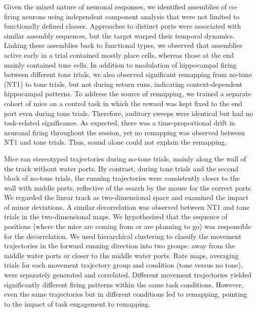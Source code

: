 Given the mixed nature of neuronal responses, we identified assemblies of co-firing neurons using independent component analysis that were not limited to functionally defined classes. Approaches to distinct ports were associated with similar assembly sequences, but the target warped their temporal dynamics. Linking these assemblies back to functional types, we observed that assemblies active early in a trial contained mostly place cells, whereas those at the end mainly contained tone cells. In addition to modulation of hippocampal firing between different tone trials, we also observed significant remapping from no-tone (NT1) to tone trials, but not during return runs, indicating context-dependent hippocampal patterns. To address the source of remapping, we trained a separate cohort of mice on a control task in which the reward was kept fixed to the end port even during tone trials. Therefore, auditory sweeps were identical but had no task-related significance. As expected, there was a time-proportional drift in neuronal firing throughout the session, yet no remapping was observed between NT1 and tone trials. Thus, sound alone could not explain the remapping.

Mice ran stereotyped trajectories during no-tone trials, mainly along the wall of the track without water ports. By contrast, during tone trials and the second block of no-tone trials, the running trajectories were consistently closer to the wall with middle ports, reflective of the search by the mouse for the correct ports. We regarded the linear track as two-dimensional space and examined the impact of minor deviations. A similar decorrelation was observed between NT1 and tone trials in the two-dimensional maps. We hypothesized that the sequence of positions (where the mice are coming from or are planning to go) was responsible for the decorrelation. We used hierarchical clustering to classify the movement trajectories in the forward running direction into two groups: away from the middle water ports or closer to the middle water ports. Rate maps, averaging trials for each movement trajectory group and condition (tone versus no tone), were separately generated and correlated. Different movement trajectories yielded significantly different firing patterns within the same task conditions. However, even the same trajectories but in different conditions led to remapping, pointing to the impact of task engagement to remapping.


